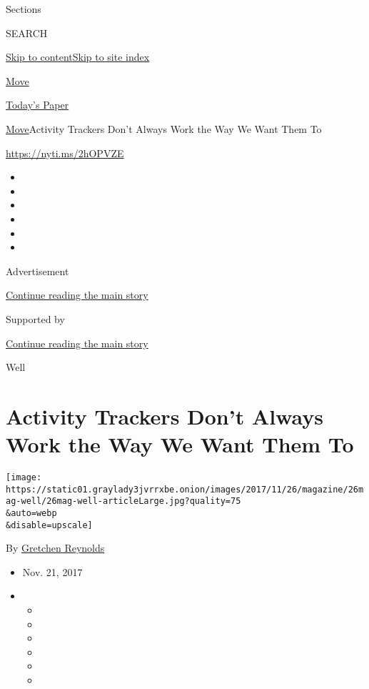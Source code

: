 Sections

SEARCH

\protect\hyperlink{site-content}{Skip to
content}\protect\hyperlink{site-index}{Skip to site index}

\href{https://www.nytimes3xbfgragh.onion/section/well/move}{Move}

\href{https://myaccount.nytimes3xbfgragh.onion/auth/login?response_type=cookie\&client_id=vi}{}

\href{https://www.nytimes3xbfgragh.onion/section/todayspaper}{Today's
Paper}

\href{/section/well/move}{Move}\textbar{}Activity Trackers Don't Always
Work the Way We Want Them To

\url{https://nyti.ms/2hOPVZE}

\begin{itemize}
\item
\item
\item
\item
\item
\item
\end{itemize}

Advertisement

\protect\hyperlink{after-top}{Continue reading the main story}

Supported by

\protect\hyperlink{after-sponsor}{Continue reading the main story}

Well

\hypertarget{activity-trackers-dont-always-work-the-way-we-want-them-to}{%
\section{Activity Trackers Don't Always Work the Way We Want Them
To}\label{activity-trackers-dont-always-work-the-way-we-want-them-to}}

\texttt{[image: https://static01.graylady3jvrrxbe.onion/images/2017/11/26/magazine/26mag-well/26mag-well-articleLarge.jpg?quality=75\\\&auto=webp\\\&disable=upscale]}

By
\href{https://www.nytimes3xbfgragh.onion/by/gretchen-reynolds}{Gretchen
Reynolds}

\begin{itemize}
\item
  Nov. 21, 2017
\item
  \begin{itemize}
  \item
  \item
  \item
  \item
  \item
  \item
  \end{itemize}
\end{itemize}

